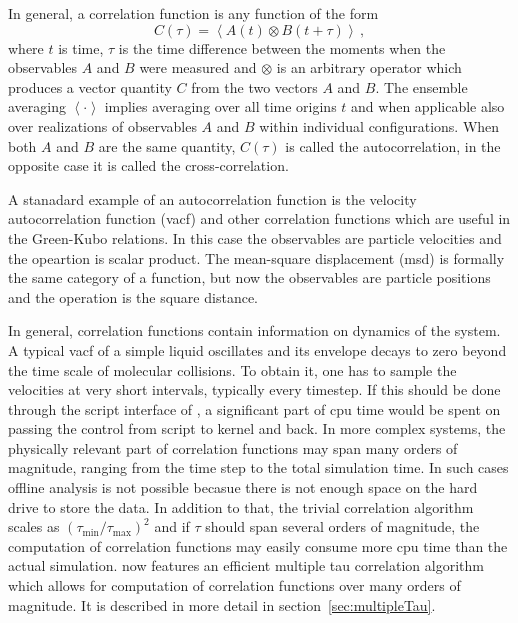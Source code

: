 In general, a correlation function is any function of the form
\begin{equation}
C(\tau) = \left<A\left(t\right) \otimes B\left(t+\tau\right)\right>\,,
\end{equation}
where $t$ is time, $\tau$ is the time difference between the moments
when the observables $A$ and $B$ were measured and $\otimes$ is an
arbitrary operator which produces a vector quantity 
$C$ from the two vectors $A$ and $B$. The ensemble averaging $\left< \cdot \right>$
implies averaging over all time origins $t$ and when applicable also
over realizations of observables $A$ and $B$ within individual configurations.
When both $A$ and $B$ are
the same quantity, $C(\tau)$ is called the autocorrelation, 
in the opposite case it is called the cross-correlation.

A stanadard example of an autocorrelation function is the velocity
autocorrelation function (vacf) and other correlation functions
which are useful in the Green-Kubo relations. In this case the observables
are particle velocities and the opeartion is scalar product.
The mean-square displacement (msd) is formally the same category of
a function, but now the observables are particle positions and
the operation is the square distance. 

In general, correlation functions
contain information on dynamics of the system. A typical vacf of a 
simple liquid oscillates and its envelope decays to zero beyond the 
time scale of molecular collisions.
To obtain it, one has to sample the velocities at very short intervals,
typically every timestep. If this should be done through the script interface
of \es, a significant part of cpu time would be spent on passing the control
from script to kernel and back. In more complex systems, the physically relevant 
part of correlation functions may span many orders of magnitude, ranging
from the time step to the total simulation time. In such cases offline
analysis is not possible becasue there is not enough space on the hard
drive to store the data. In addition to that, the trivial correlation algorithm
scales as $(\tau_{\mathrm{min}}/\tau_{\mathrm{max}})^2$ and if $\tau$
should span several orders of magnitude, the computation of correlation
functions may easily consume more cpu time than the actual simulation.
\es now features an efficient multiple tau correlation algorithm which
allows for computation of correlation functions over many orders of magnitude.
It is described in more detail in section~\ref{sec:multipleTau}.

